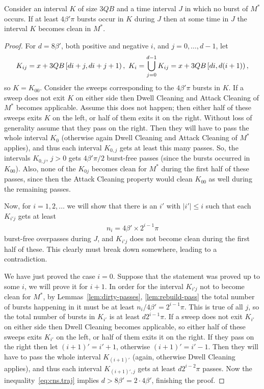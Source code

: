\documentclass[12pt]{memoir}
\renewcommand{\le}{\leq}
\def\B{B}
\newcommand{\Q}{Q}
\begin{document}
\begin{lemma}\label{lem:burst-density}
Consider an interval \( K \) of size \( 3 \Q\B \) and a time interval \( J \) in which
no burst of \( M^{*} \) occurs.
If at least \( 4\beta'\pi \) bursts occur in \( K \) during \( J \) then at some time in \( J \)
the interval \( K \) becomes clean in \( M^{*} \).
\end{lemma}
\begin{proof} 
For \( d=8\beta' \), both positive and negative \( i \), and \( j=0,\dots,d-1 \), let
\begin{align*}
   K_{ij}=x+3\Q\B\lint{d i+j}{d i+j+1},\ 
K_{i}=\bigcup_{j=0}^{d-1}K_{ij}=x+3\Q\B\lint{d i}{d(i+1)},
 \end{align*}
so \( K=K_{00} \).
Consider the sweeps corresponding to the \( 4\beta'\pi \) bursts in \( K \).
If a sweep does not exit \( K \) on either side then Dwell Cleaning and Attack Cleaning
of \( M^{*} \) becomes applicable.
Assume this does not happen; then
either half of these sweeps exits \( K \) on the left, or half of them exits it on the right.
Without loss of generality assume that they pass on the right.
Then they will have to pass the whole interval \( K_{0} \) (otherwise again Dwell Cleaning
and Attack Cleaning of \( M^{*} \)
applies), and thus each interval \( K_{0,j} \) gets at least this many passes.
So, the intervals \( K_{0,j} \), \( j>0 \) gets \( 4\beta'\pi/2 \) burst-free passes (since the 
bursts occurred in \( K_{00} \)).
Also, none of the \( K_{0j} \) becomes clean for \( M^{*} \) during the first half of these passes,
since then the Attack Cleaning property would clean \( K_{00} \) as well during the remaining
passes.

Now, for \( i=1,2,\dots \) we will show that there is 
an \( i'  \) with \( |i'|\le i \) such that each \( K_{i'j} \) gets at least 
\begin{align*}
  n_{i}= 4\beta'\times 2^{i-1}\pi
\end{align*}
 burst-free overpasses  during \( J \), 
and \( K_{i'j} \) does not become clean during the first half of these.
This clearly must break down somewhere, leading to a contradiction.

We have just proved the case \( i=0 \).
Suppose that the statement was proved up to some \( i \), we will prove it for \( i+1 \).
In order for the interval \( K_{i'j} \) not to become clean for \( M^{*} \), 
by Lemmas~\ref{lem:dirty-passes}, \ref{lem:rebuild-pass}
the total number of bursts happening in it must be at least \( n_{i}/4\beta' = 2^{i-1}\pi \).
This is true of all \( j \), so the total number of bursts in \( K_{i'} \)
is at least \( d 2^{i-1}\pi \).
If a sweep does not exit \( K_{i'} \) on either side then Dwell Cleaning becomes applicable,
so either half of these sweeps exits \( K_{i'} \) on the left, or half of them exits it on the right.
If they pass on the right then let \( (i+1)'=i'+1 \), otherwise \( (i+1)'=i'-1 \).
Then they will have to pass the whole interval \( K_{(i+1)'} \) (again, otherwise Dwell Cleaning
applies), and thus each interval \( K_{(i+1)',j} \) gets at least \( d 2^{i-2}\pi \) passes.
Now the inequality~\eqref{eq:cns.traj} implies \( d > 8\beta'=2\cdot 4\beta' \), finishing the proof.
\end{proof}
\end{document}
